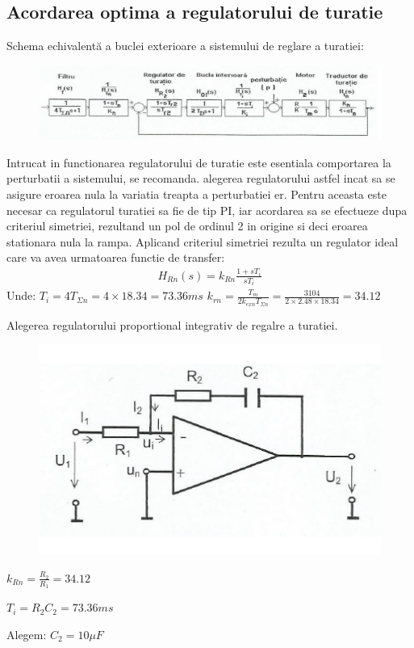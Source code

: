 \documentclass[11pt]{article}
\begin{document}
\subsection{Acordarea optima a regulatorului de turatie}
Schema echivalentă a buclei exterioare a sistemului de reglare a turatiei:
\begin{figure}[H]
	\centering
	\includegraphics[width=.9\linewidth]{fig17.png}
	\label{fig:test2}
\end{figure}
Intrucat in functionarea regulatorului de turatie este esentiala comportarea la perturbatii a sistemului, se recomanda. alegerea regulatorului astfel incat sa se asigure eroarea nula la variatia treapta a perturbatiei er. Pentru aceasta este necesar ca regulatorul turatiei sa fie de tip PI, iar acordarea sa se efectueze dupa criteriul simetriei, rezultand un pol de ordinul 2 in origine si deci eroarea stationara nula la rampa. Aplicand criteriul simetriei rezulta un regulator ideal care va avea urmatoarea functie de transfer:
\begin{align*}
H_{Rn}(s)=k_{Rn}\frac{1+sT_i}{sT_i}
\end{align*}
Unde:
$T_i=4T_{\Sigma n}=4\times 18.34=73.36ms$
$k_{rn}=\frac{T_m}{2k_{exn}T_{\Sigma n}}=\frac{3104}{2\times 2.48 
\times 18.34}=34.12$

Alegerea regulatorului proportional integrativ de regalre a turatiei.
\begin{figure}[H]
	\centering
	\includegraphics[width=.5\linewidth]{fig18.png}
	\label{fig:test2}
\end{figure}

$k_{Rn}=\frac{R_2}{R_1}=34.12$

$T_i=R_2C_2=73.36ms$

Alegem:
$C_2=10\mu F$
\end{document}
